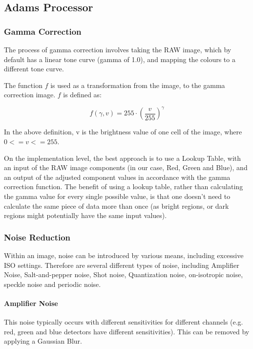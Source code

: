 \documentclass[11pt,a4paper]{article}
\begin{document}
\subsection{Adams Processor}\label{AdamsProcessor}
\subsubsection{Gamma Correction}
The process of gamma correction involves taking the RAW image, which by default has a linear tone curve (gamma of 1.0), and
mapping the colours to a different tone curve.

The function $f$ is used as a transformation from the image, to the gamma correction image. $f$ is defined as:

$$f(\gamma, v) = 255 \cdot (\frac{v}{255})^{\gamma}$$

In the above definition, v is the brightness value of one cell of the image, where $0 <= v <= 255$.

On the implementation level, the best approach is to use a Lookup Table, with an input of the RAW image components (in our case, Red, Green and Blue),
and an output of the adjusted component values in accordance with the gamma correction function. The benefit of using a lookup table, rather than calculating
the gamma value for every single possible value, is that one doesn't need to calculate the same piece of data more than once (as bright regions, or dark regions might
potentially have the same input values). 

\subsubsection{Noise Reduction}
Within an image, noise can be introduced by various means, including excessive ISO settings. Therefore are several different
types of noise, including Amplifier Noise, Salt-and-pepper noise, Shot noise, Quantization noise, on-isotropic noise, speckle noise
and periodic noise. 
\cite{NRandFiltering}





\paragraph{Amplifier Noise}
    This noise typically occurs with different sensitivities for different channels (e.g. red, green and blue detectors have
    different sensitivities). \cite{NRandFiltering}
    This can be removed by applying a Gaussian Blur. \cite{DigitalImageProcessingTextbook}
\end{document}
